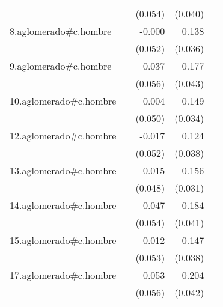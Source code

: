 {\begin{longtable}{l*{4}{D{.}{.}{-1}}}
            &                     &     (0.054)         &     (0.040)         &                     \\
\addlinespace
8.aglomerado#c.hombre&                     &      -0.000         &       0.138\sym{***}&                     \\
            &                     &     (0.052)         &     (0.036)         &                     \\
\addlinespace
9.aglomerado#c.hombre&                     &       0.037         &       0.177\sym{***}&                     \\
            &                     &     (0.056)         &     (0.043)         &                     \\
\addlinespace
10.aglomerado#c.hombre&                     &       0.004         &       0.149\sym{***}&                     \\
            &                     &     (0.050)         &     (0.034)         &                     \\
\addlinespace
12.aglomerado#c.hombre&                     &      -0.017         &       0.124\sym{**} &                     \\
            &                     &     (0.052)         &     (0.038)         &                     \\
\addlinespace
13.aglomerado#c.hombre&                     &       0.015         &       0.156\sym{***}&                     \\
            &                     &     (0.048)         &     (0.031)         &                     \\
\addlinespace
14.aglomerado#c.hombre&                     &       0.047         &       0.184\sym{***}&                     \\
            &                     &     (0.054)         &     (0.041)         &                     \\
\addlinespace
15.aglomerado#c.hombre&                     &       0.012         &       0.147\sym{***}&                     \\
            &                     &     (0.053)         &     (0.038)         &                     \\
\addlinespace
17.aglomerado#c.hombre&                     &       0.053         &       0.204\sym{***}&                     \\
            &                     &     (0.056)         &     (0.042)         &                     \\

\end{longtable}}
